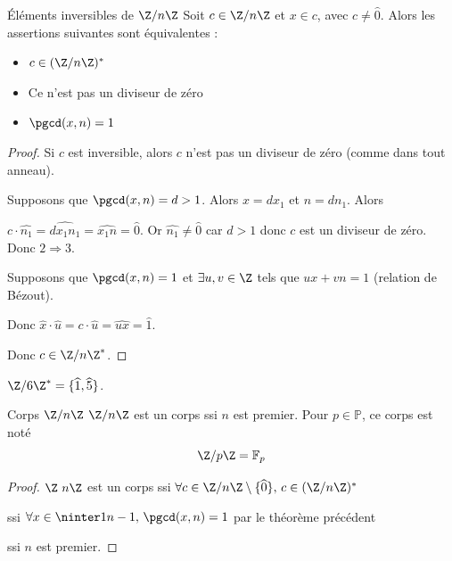 \begin{theoreme}{Éléments inversibles de $\Z / n \Z$}{}
    Soit $c \in \Z/n \Z$ et $x \in c$, avec $c \neq \hat 0$. 
    Alors les assertions suivantes sont équivalentes : 
    
    \begin{itemize}
        \item $c \in (\Z / n \Z)^*$
        \item Ce n'est pas un diviseur de zéro
        \item $\pgcd(x, n) = 1$ 
    \end{itemize}
\end{theoreme}


\begin{proof}
    Si $c$ est inversible, alors $c$ n'est pas un diviseur de zéro (comme dans tout anneau).

    Supposons que $\pgcd(x, n) = d > 1$. Alors $x = d x_1$ et $n = d n_1$. Alors 

    $c \cdot \widehat{n_1} = \widehat{dx_1n_1} = \widehat{x_1n} = \widehat{0}$. 
    Or $\widehat {n_1} \neq \widehat{0}$ car $d > 1$ donc $c$ est un diviseur de zéro.
    Donc $2 \Rightarrow 3$.

    \avspace Supposons que $\pgcd(x, n) = 1$ et $\exists u, v \in \Z$ tels que $ux + vn = 1$ (relation de Bézout).

    Donc $\widehat x \cdot \widehat u = c \cdot \widehat u = \widehat{ux} = \widehat{1}$.

    Donc $c \in \Z/n\Z^*$.
\end{proof}

\begin{exemple}
    $\Z/6\Z^* = \{\widehat{1}, \widehat{5}\}$.
\end{exemple}

\begin{theoreme}{Corps $\Z/n\Z$}{}
    $\Z/n\Z$ est un corps ssi $n$ est premier. Pour $p \in \mathbb{P}$, ce corps est noté 
    $$\Z/p\Z = \mathbb{F}_p$$
\end{theoreme}

\begin{proof}
    $\Z \ n \Z$ est un corps ssi $\forall c \in \Z / n \Z \setminus \{\widehat{0}\}, \, c \in (\Z / n \Z)^*$

    ssi $\forall x \in \ninter 1 {n - 1}, \, \pgcd(x, n) = 1$ par le théorème précédent

    ssi $n$ est premier.
\end{proof}

